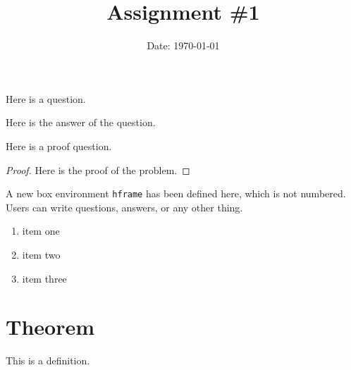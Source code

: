 \documentclass[12pt,en]{homework}
\title{Assignment \#1} %
\date{Date: \today} %
\institute{\scshape Institute or school name} %
\begin{document}
\maketitle




\begin{problem}
Here is a question.
\end{problem}

\begin{solution}
Here is the answer of the question.
\end{solution}


\begin{problem}
Here is a proof question.
\end{problem}

\begin{proof}
Here is the proof of the problem.
\end{proof}



\begin{hframe}
A new box environment \verb|hframe| has been defined here, which is not numbered.
Users can write questions, answers, or any other thing.
\begin{enumerate}
  \item item one
  \item item two
  \item item three
\end{enumerate}
\end{hframe}



\section*{Theorem}

\begin{definition}\label{def:foo}
This is a definition.
\end{definition}
\end{document}
